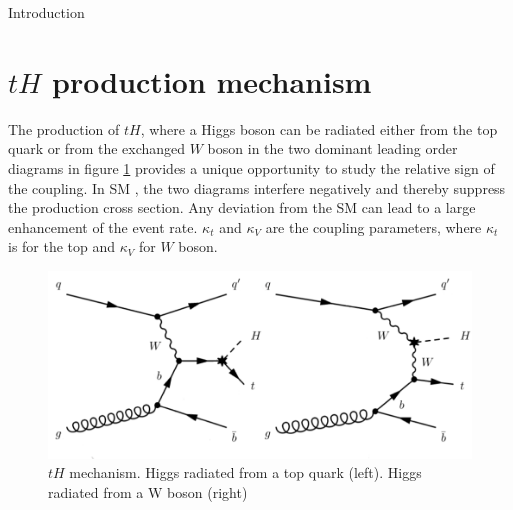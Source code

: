 \begin{chapter}{Introduction}
\section{$tH$ production mechanism}
The production of $tH$, where a Higgs boson can be radiated
either from the top quark or from the exchanged $W$ boson in the two dominant leading order
diagrams in figure \ref{newth} provides a unique opportunity to study the relative sign of the coupling.
In SM , the two diagrams interfere negatively and thereby suppress the production cross section.
Any deviation from the SM can lead to a large enhancement of the event rate.
 $\kappa_t$ and $\kappa_V$ are the coupling parameters, where $\kappa_t$ is for the top and $\kappa_V$ for $W$ boson. \\

\begin{figure}[ht]
	\centering
	\includegraphics[scale=0.5]{Chapter1/newtHq.png}
	\caption[$tH$ mechanism. Higgs radiated from a top quark (left). Higgs radiated from a W boson (right)]{$tH$ mechanism. Higgs radiated from a top quark (left). Higgs radiated from a W boson (right) \protect \cite{bb}} \label{newth}
\end{figure}
\pagebreak



\end{chapter}













